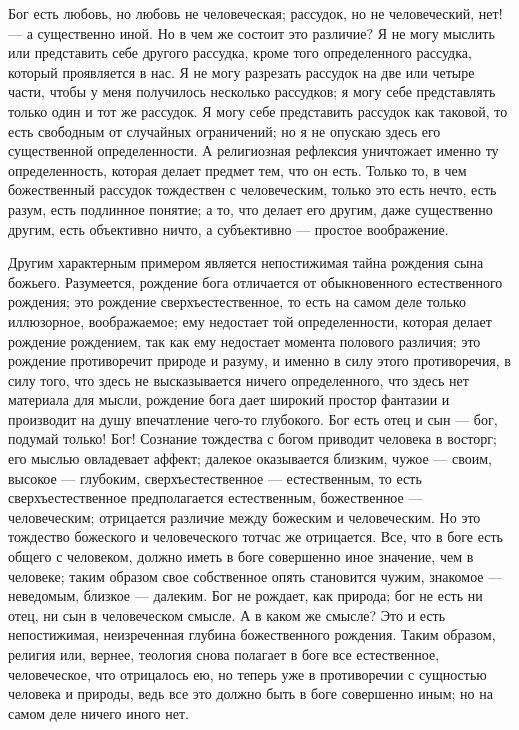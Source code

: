 \documentclass[12pt,oneside]{book}
\begin{document}
Бог есть любовь, но любовь не человеческая; рассудок, но не человеческий, нет! --- а существенно иной. Но в чем же состоит это различие? Я не могу мыслить или представить себе другого рассудка, кроме того определенного рассудка, который проявляется в нас. Я не могу разрезать рассудок на две или четыре части, чтобы у меня получилось несколько рассудков; я могу себе представлять только один и тот же рассудок. Я могу себе представить рассудок как таковой, то есть свободным от случайных ограничений; но я не опускаю здесь его существенной определенности. А религиозная рефлексия уничтожает именно ту определенность, которая делает предмет тем, что он есть. Только то, в чем божественный рассудок тождествен с человеческим, только это есть нечто, есть разум, есть подлинное понятие; а то, что делает его другим, даже существенно другим, есть объективно ничто, а субъективно --- простое воображение.

Другим характерным примером является непостижимая тайна рождения сына божьего. Разумеется, рождение бога отличается от обыкновенного естественного рождения; это рождение сверхъестественное, то есть на самом деле только иллюзорное, воображаемое; ему недостает той определенности, которая делает рождение рождением, так как ему недостает момента полового различия; это рождение противоречит природе и разуму, и именно в силу этого противоречия, в силу того, что здесь не высказывается ничего определенного, что здесь нет материала для мысли, рождение бога дает широкий простор фантазии и производит на душу впечатление чего-то глубокого. Бог есть отец и сын --- бог, подумай только! Бог! Сознание тождества с богом приводит человека в восторг; его мыслью овладевает аффект; далекое оказывается близким, чужое --- своим, высокое --- глубоким, сверхъестественное --- естественным, то есть сверхъестественное предполагается естественным, божественное --- человеческим; отрицается различие между божеским и человеческим. Но это тождество божеского и человеческого тотчас же отрицается. Все, что в боге есть общего с человеком, должно иметь в боге совершенно иное значение, чем в человеке; таким образом свое собственное опять становится чужим, знакомое --- неведомым, близкое --- далеким. Бог не рождает, как природа; бог не есть ни отец, ни сын в человеческом смысле. А в каком же смысле? Это и есть непостижимая, неизреченная глубина божественного рождения. Таким образом, религия или, вернее, теология снова полагает в боге все естественное, человеческое, что отрицалось ею, но теперь уже в противоречии с сущностью человека и природы, ведь все это должно быть в боге совершенно иным; но на самом деле ничего иного нет.
\end{document}

